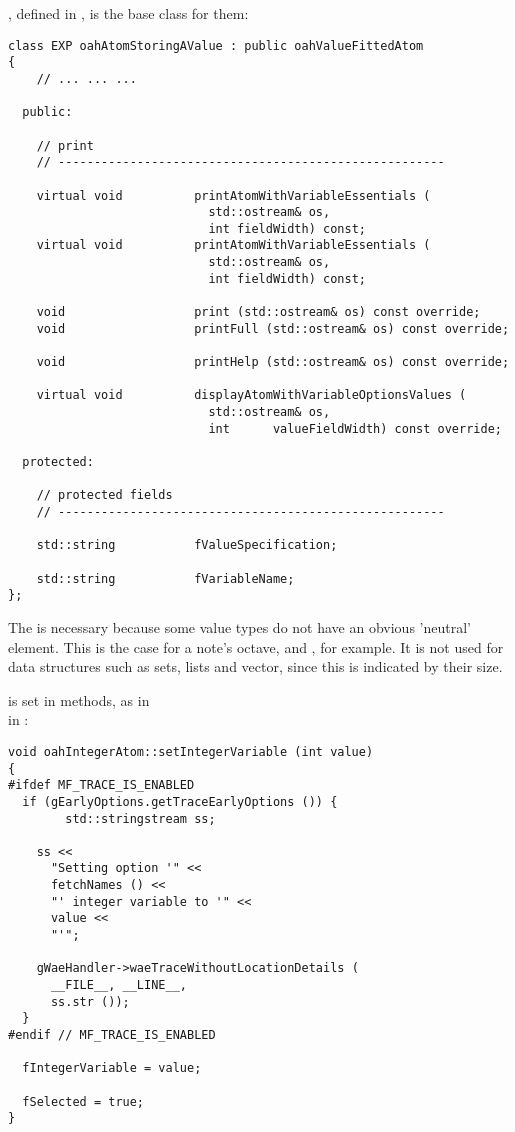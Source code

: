 , defined in , is the base class   for them:
\begin{lstlisting}[language=CPlusPlus]
class EXP oahAtomStoringAValue : public oahValueFittedAtom
{
	// ... ... ...

  public:

    // print
    // ------------------------------------------------------

    virtual void          printAtomWithVariableEssentials (
                            std::ostream& os,
                            int fieldWidth) const;
    virtual void          printAtomWithVariableEssentials (
                            std::ostream& os,
                            int fieldWidth) const;

    void                  print (std::ostream& os) const override;
    void                  printFull (std::ostream& os) const override;

    void                  printHelp (std::ostream& os) const override;

    virtual void          displayAtomWithVariableOptionsValues (
                            std::ostream& os,
                            int      valueFieldWidth) const override;

  protected:

    // protected fields
    // ------------------------------------------------------

    std::string           fValueSpecification;

    std::string           fVariableName;
};
\end{lstlisting}

The  is necessary because some value types do not have an obvious 'neutral' element. This is the case for a note's octave,  and , for example. It is not used for data structures such as sets, lists and vector, since this is indicated by their size.

 is set in  methods, as in \\
in :
\begin{lstlisting}[language=CPlusPlus]
void oahIntegerAtom::setIntegerVariable (int value)
{
#ifdef MF_TRACE_IS_ENABLED
  if (gEarlyOptions.getTraceEarlyOptions ()) {
		std::stringstream ss;

    ss <<
      "Setting option '" <<
      fetchNames () <<
      "' integer variable to '" <<
      value <<
      "'";

    gWaeHandler->waeTraceWithoutLocationDetails (
      __FILE__, __LINE__,
      ss.str ());
  }
#endif // MF_TRACE_IS_ENABLED

  fIntegerVariable = value;

  fSelected = true;
}
\end{lstlisting}


